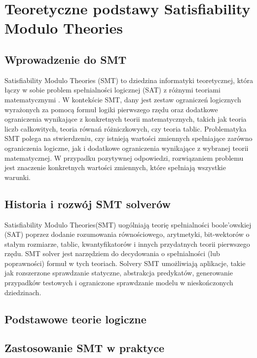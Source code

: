\chapter{Teoretyczne podstawy Satisfiability Modulo Theories}

\section{Wprowadzenie do SMT}
	Satisfiability Modulo Theories (SMT) to dziedzina informatyki teoretycznej, która łączy w sobie problem spełnialności logicznej (SAT) z różnymi teoriami matematycznymi \cite{MouraB11}. 
	W kontekście SMT, dany jest zestaw ograniczeń logicznych wyrażonych za pomocą formuł logiki pierwszego rzędu oraz dodatkowe ograniczenia wynikające z konkretnych teorii matematycznych, takich jak teoria liczb całkowitych, teoria równań różniczkowych, czy teoria tablic.
	Problematyka SMT polega na stwierdzeniu, czy istnieją wartości zmiennych spełniające zarówno ograniczenia logiczne, jak i dodatkowe ograniczenia wynikające z wybranej teorii matematycznej. W przypadku pozytywnej odpowiedzi, rozwiązaniem problemu jest znaczenie konkretnych wartości zmiennych, które spełniają wszystkie warunki.
	
\section{Historia i rozwój SMT solverów}
Satisfiability Modulo Theories(SMT) uogólniają teorię spełnialności boole'owskiej (SAT) poprzez dodanie rozumowania równościowego, arytmetyki, bit-wektorów o stałym rozmiarze, tablic, kwantyfikatorów i innych przydatnych teorii pierwszego rzędu.
SMT solver jest narzędziem do decydowania o spełnialności (lub poprawności) formuł w tych teoriach. 
Solvery SMT umożliwiają aplikacje, takie jak rozszerzone sprawdzanie statyczne, abstrakcja predykatów, generowanie przypadków testowych i ograniczone sprawdzanie modelu w nieskończonych dziedzinach.

\section{Podstawowe teorie logiczne}

\section{Zastosowanie SMT w praktyce}


